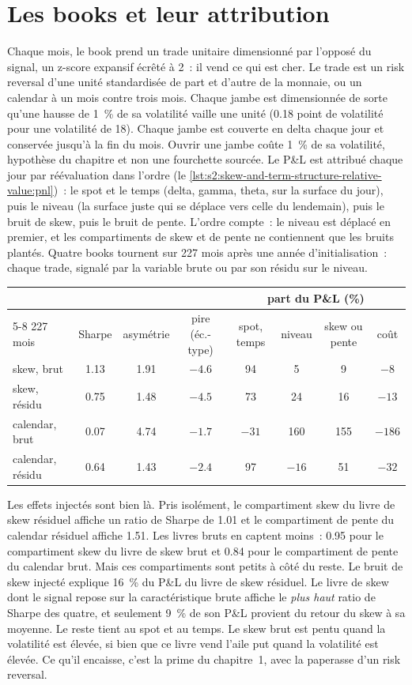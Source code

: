 \section{Les books et leur attribution}

Chaque mois, le book prend un trade unitaire dimensionné par l'opposé du signal, un z-score expansif écrêté à 2~: il vend ce qui est cher. Le trade est un risk
reversal d'une unité standardisée de part et d'autre de la monnaie, ou un calendar à un mois contre trois mois. Chaque jambe est dimensionnée de sorte qu'une hausse de 1~\% de
sa volatilité vaille une unité (0.18 point de volatilité pour une volatilité de 18). Chaque jambe est couverte en delta chaque jour et conservée jusqu'à la fin du mois. Ouvrir une jambe coûte
1~\% de sa volatilité, hypothèse du chapitre et non une fourchette sourcée. Le P\&L est attribué chaque jour par réévaluation dans l'ordre
(le \cref{lst:s2:skew-and-term-structure-relative-value:pnl})~: le spot et le temps (delta, gamma, theta, sur la surface du jour), puis le niveau (la surface juste
qui se déplace vers celle du lendemain), puis le bruit de skew, puis le bruit de pente. L'ordre compte~: le niveau est déplacé en premier, et les compartiments de skew et de pente ne
contiennent que les bruits plantés. Quatre books tournent sur 227 mois après une année d'initialisation~: chaque trade, signalé par la variable brute ou par son résidu sur le
niveau.

\begin{center}
\small
\begin{tabular}{@{}lccccccc@{}}
\toprule
& & & & \multicolumn{4}{c}{part du P\&L (\%)}\\
\cmidrule(l){5-8}
227 mois & Sharpe & asymétrie & pire (éc.-type) & spot, temps & niveau & skew ou pente & coût\\
\midrule
skew, brut & 1.13 & 1.91 & $-4.6$ & 94 & 5 & 9 & $-8$\\
skew, résidu & 0.75 & 1.48 & $-4.5$ & 73 & 24 & 16 & $-13$\\
calendar, brut & 0.07 & 4.74 & $-1.7$ & $-31$ & 160 & 155 & $-186$\\
calendar, résidu & 0.64 & 1.43 & $-2.4$ & 97 & $-16$ & 51 & $-32$\\
\bottomrule
\end{tabular}
\end{center}

Les effets injectés sont bien là. Pris isolément, le compartiment skew du livre de skew résiduel affiche un ratio de Sharpe de 1.01 et le compartiment de pente du
calendar résiduel affiche 1.51. Les livres bruts en captent moins~: 0.95 pour le compartiment skew du livre de skew brut et 0.84 pour le compartiment de pente du calendar brut. Mais ces
compartiments sont petits à côté du reste. Le bruit de skew injecté explique 16~\% du P\&L du livre de skew résiduel. Le livre de skew dont le signal repose sur la caractéristique brute
affiche le \emph{plus haut} ratio de Sharpe des quatre, et seulement 9~\% de son P\&L provient du retour du skew à sa moyenne. Le reste tient au spot et au temps. Le skew brut est
pentu quand la volatilité est élevée, si bien que ce livre vend l'aile put quand la volatilité est élevée. Ce qu'il encaisse, c'est la prime du chapitre~1, avec la paperasse d'un risk reversal.

